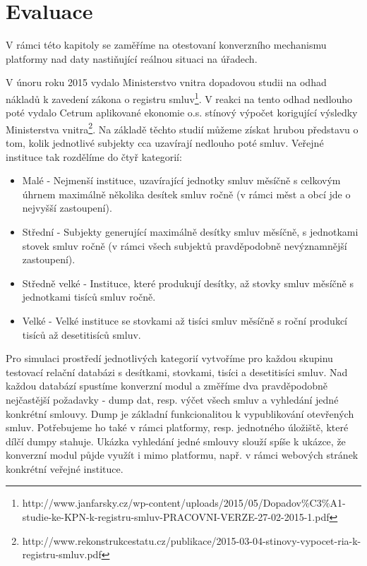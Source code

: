 \chapter{Evaluace}

V rámci této kapitoly se zaměříme na otestovaní konverzního mechanismu platformy nad daty nastiňující reálnou situaci na úřadech.

V únoru roku 2015 vydalo Ministerstvo vnitra dopadovou studii na odhad nákladů k zavedení zákona o registru smluv\footnote{http://www.janfarsky.cz/wp-content/uploads/2015/05/Dopadov\%C3\%A1-studie-ke-KPN-k-registru-smluv-PRACOVNI-VERZE-27-02-2015-1.pdf}. V reakci na tento odhad nedlouho poté vydalo Cetrum aplikované ekonomie o.s. stínový výpočet korigující výsledky Ministerstva vnitra\footnote{ http://www.rekonstrukcestatu.cz/publikace/2015-03-04-stinovy-vypocet-ria-k-registru-smluv.pdf}. Na základě těchto studií můžeme získat hrubou představu o tom, kolik jednotlivé subjekty cca uzavírají nedlouho poté smluv. Veřejné instituce tak rozdělíme do čtyř kategorií:  

\begin{itemize}
\item Malé - Nejmenší instituce, uzavírající jednotky smluv měsíčně s celkovým úhrnem maximálně několika desítek smluv ročně (v rámci měst a obcí jde o nejvyšší zastoupení).
\item Střední - Subjekty generující maximálně desítky smluv měsíčně, s jednotkami stovek smluv ročně (v rámci všech subjektů pravděpodobně nevýznamnější zastoupení). 
\item Středně velké - Instituce, které produkují desítky, až stovky smluv měsíčně s jednotkami tisíců smluv ročně.
\item Velké - Velké instituce se stovkami až tisíci smluv měsíčně s roční produkcí tisíců až desetitisíců smluv.
\end{itemize}

Pro simulaci prostředí jednotlivých kategorií vytvoříme pro každou skupinu testovací relační databázi s desítkami, stovkami, tisíci a desetitisíci smluv. Nad každou databází spustíme konverzní modul a změříme dva pravděpodobně nejčastější požadavky - dump dat, resp. výčet všech smluv a vyhledání jedné konkrétní smlouvy. Dump je základní funkcionalitou k vypublikování otevřených smluv. Potřebujeme ho také v rámci platformy, resp. jednotného úložiště, které dílčí dumpy stahuje. Ukázka vyhledání jedné smlouvy slouží spíše k ukázce, že konverzní modul půjde využít i mimo platformu, např. v rámci webových stránek konkrétní veřejné instituce.   

